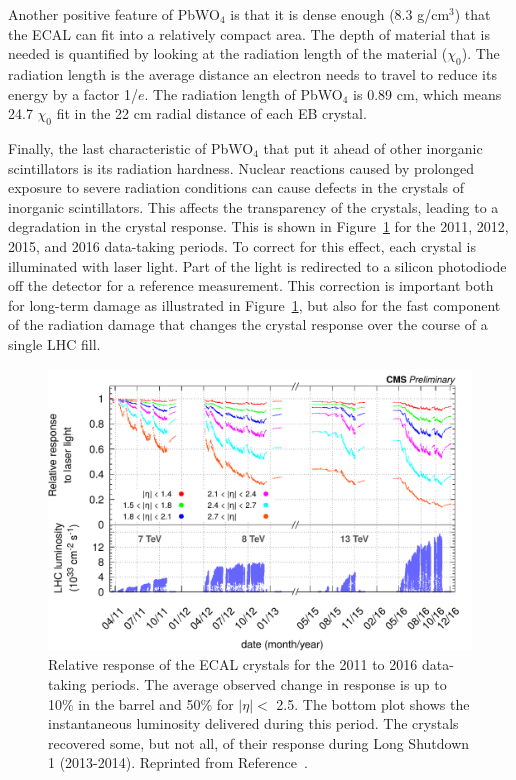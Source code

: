 Another positive feature of PbWO$_4$ is that it is dense enough (8.3 g/cm$^3$) that the ECAL can fit into a relatively compact area. The depth of material that is needed is quantified by looking at the radiation length of the material ($\chi_0$). The radiation length is the average distance an electron needs to travel to reduce its energy by a factor 1/$e$. The radiation length of PbWO$_4$ is 0.89 cm, which means 24.7 $\chi_0$ fit in the 22 cm radial distance of each EB crystal.

Finally, the last characteristic of PbWO$_4$ that put it ahead of other inorganic scintillators is its radiation hardness. Nuclear reactions caused by prolonged exposure to severe radiation conditions can cause defects in the crystals of inorganic scintillators. This affects the transparency of the crystals, leading to a degradation in the crystal response. This is shown in Figure~\ref{fig:ecal_response} for the 2011, 2012, 2015, and 2016 data-taking periods. To correct for this effect, each crystal is illuminated with laser light. Part of the light is redirected to a silicon photodiode off the detector for a reference measurement. This correction is important both for long-term damage as illustrated in Figure~\ref{fig:ecal_response}, but also for the fast component of the radiation damage that changes the crystal response over the course of a single LHC fill.

\begin{figure}[h!]
	\centering
	\includegraphics[width=\linewidth]{Figures/Detector/ecal_response.png}
       \caption{ Relative response of the ECAL crystals for the 2011 to 2016 data-taking periods.
       The average observed change in response is up to 10\% in the barrel and 50\% for $|\eta| <$ 2.5. 
       The bottom plot shows the instantaneous luminosity delivered during this period. The crystals recovered 
       some, but not all, of their response during Long Shutdown 1 (2013-2014). Reprinted from Reference~\cite{ECALDPGtwiki}.}
   	\label{fig:ecal_response}
\end{figure}


